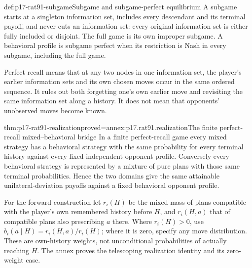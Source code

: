 \begin{hbdefinition}{def:p17-rat91-subgame}{Subgame and subgame-perfect equilibrium}
A subgame starts at a singleton information set, includes every
descendant and its terminal payoff, and never cuts an information set:
every original information set is either fully included or disjoint.
The full game is its own improper subgame. A behavioral profile is
subgame perfect when its restriction is Nash in every subgame,
including the full game.

Perfect recall means that at any two nodes in one information set,
the player's earlier information sets and its own chosen moves occur
in the same ordered sequence. It rules out both forgetting one's own
earlier move and revisiting the same information set along a history.
It does not mean that opponents' unobserved moves become known.
\end{hbdefinition}

\begin{hbtheorem}{thm:p17-rat91-realization}{proved=annex:p17.rat91.realization}{The finite perfect-recall mixed--behavioral bridge}
In a finite perfect-recall game every mixed strategy has a behavioral
strategy with the same probability for every terminal history against
every fixed independent opponent profile. Conversely every behavioral
strategy is represented by a mixture of pure plans with those same
terminal probabilities. Hence the two domains give the same attainable
unilateral-deviation payoffs against a fixed behavioral opponent profile.

For the forward construction let \(r_i(H)\) be the mixed mass of
plans compatible with the player's own remembered history before
\(H\), and \(r_i(H,a)\) that of compatible plans also prescribing
\(a\) there. Where \(r_i(H)>0\), use
\(b_i(a\mid H)=r_i(H,a)/r_i(H)\); where it is zero, specify
any move distribution. These are own-history weights, not unconditional
probabilities of actually reaching \(H\). The annex proves the
telescoping realization identity and its zero-weight case.
\end{hbtheorem}

